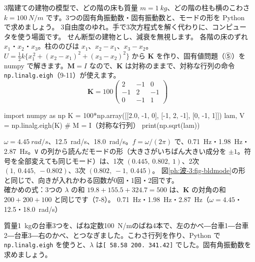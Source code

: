 \label{ph:波-3:ex7}
\begin{phreidai}
3階建ての建物の模型で、どの階の床も質量 $m=\qty{1}{kg}$、どの階の柱も横のこわさ $k=\qty{100}{N/m}$ です。3つの固有角振動数・固有振動数と、モードの形を Python で求めましょう。
\phbamen
3自由度のゆれ。手で3次方程式を解く代わりに、コンピュータを使う場面です。
\phmushi
せん断型の建物とし、減衰を無視します。
\phzu
各階の床のずれ $x_1$・$x_2$・$x_3$。柱ののびは $x_1$、$x_2-x_1$、$x_3-x_2$。
\phriyu
$U=\tfrac12k\{x_1^{\,2}+(x_2-x_1)^2+(x_3-x_2)^2\}$ から $\mathbf K$ を作り、固有値問題（⑤）を numpy で解きます。$\mathbf M=I$ なので、$\mathbf K$ は対称のままで、対称な行列の命令 \texttt{np.linalg.eigh}（9-11）が使えます。
\phtateru
\[\mathbf K=100\begin{pmatrix}2&-1&0\\-1&2&-1\\0&-1&1\end{pmatrix}\]
\begin{phcode}[Python]
import numpy as np
K = 100*np.array([[2.0, -1, 0], [-1, 2, -1], [0, -1, 1]])
lam, V = np.linalg.eigh(K)     \# M = I（対称な行列）
print(np.sqrt(lam))
\end{phcode}
\begin{phcodeout}[実行結果]
[ 4.45041868 12.46979604 18.01937736]
\end{phcodeout}
\phtoku
$\omega=\qty{4.45}{rad/s}$、\qty{12.5}{rad/s}、\qty{18.0}{rad/s}。$f=\omega/(2\pi)$ で、\qty{0.71}{Hz}・\qty{1.98}{Hz}・\qty{2.87}{Hz}。\texttt{V} の列から読んだモードの形（大きさがいちばん大きい成分を $\pm1$。符号を全部変えても同じモード）は、1次 $(0.445,\ 0.802,\ 1)$、2次 $(1,\ 0.445,\ -0.802)$、3次 $(0.802,\ -1,\ 0.445)$。
\phtashikame
図\ref{ph:波-3:fig-bldmode}の形と同じで、向きが入れかわる回数が0回・1回・2回です。\\
確かめの式：3つの $\lambda$ の和 $19.8+155.5+324.7=500$ は、$\mathbf K$ の対角の和 $200+200+100$ と同じです（7-8）。
\kotae \qty{0.71}{Hz}・\qty{1.98}{Hz}・\qty{2.87}{Hz}（$\omega=4.45$・12.5・\qty{18.0}{rad/s}）
\end{phreidai}
\begin{jibun}
質量\qty{1}{kg}の台車3つを、ばね定数\qty{100}{N/m}のばね4本で、左のかべ―台車1―台車2―台車3―右のかべ、とつなぎました。こわさ行列を作り、Python で \texttt{np.linalg.eigh} を使うと、$\lambda$ は\texttt{[ 58.58 200. 341.42]} でした。固有角振動数を求めましょう。
\end{jibun}

